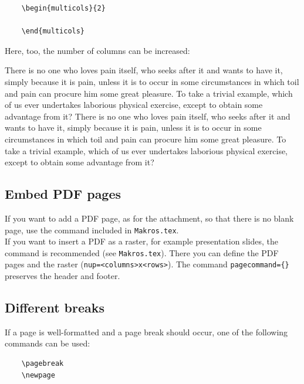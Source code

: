 \begin{verbatim}
    \begin{multicols}{2}
    	
    \end{multicols}
\end{verbatim}

Here, too, the number of columns can be increased:

\begin{multicols}{3}
	There is no one who loves pain itself, who seeks after it and wants to have it, simply because it is pain, unless it is to occur in some circumstances in which toil and pain can procure him some great pleasure. To take a trivial example, which of us ever undertakes laborious physical exercise, except to obtain some advantage from it? There is no one who loves pain itself, who seeks after it and wants to have it, simply because it is pain, unless it is to occur in some circumstances in which toil and pain can procure him some great pleasure. To take a trivial example, which of us ever undertakes laborious physical exercise, except to obtain some advantage from it?
\end{multicols}


\subsection{Embed PDF pages}

If you want to add a PDF page, as for the attachment, so that there is no blank page, use the command included in \verb|Makros.tex|.\\

If you want to insert a PDF as a raster, for example presentation slides, the command \verb|| is recommended (see \verb|Makros.tex|). There you can define the PDF pages and the raster (\verb|nup=<columns>x<rows>|). The command \verb|pagecommand={}| preserves the header and footer.


\subsection{Different breaks}

If a page is well-formatted and a page break should occur, one of the following commands can be used:

\begin{verbatim}
    \pagebreak
    \newpage
\end{verbatim}

